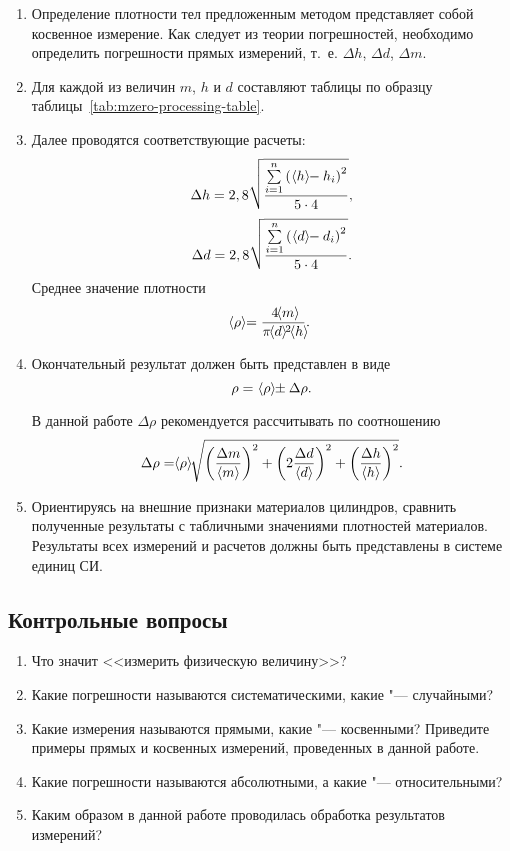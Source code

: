 \documentclass[a4paper, 12pt]{extarticle}
\newcommand{\isum}{\sum\limits_{i=1}^{n}}
\begin{document}
\begin{enumerate}
\item Определение плотности тел предложенным методом представляет собой косвенное измерение. Как следует из теории погрешностей, необходимо определить погрешности прямых измерений, т.~е. $\Delta h$, $\Delta d$, $\Delta m$.

\item Для каждой из величин $m$, $h$ и $d$ составляют таблицы по образцу таблицы~\ref{tab:mzero-processing-table}. %

\item Далее проводятся соответствующие расчеты:
\[
    \Delta h = 2,8 \sqrt{\frac{\isum\left(\ \MTDMean{h} - h_i \right)^2}{5 \cdot 4}},
\]
\[
    \Delta d = 2,8 \sqrt{\frac{\isum\left(\ \MTDMean{d} - d_i \right)^2}{5 \cdot 4}}.
\]
Среднее значение плотности
\[
\MTDMean{\rho} = \frac{4\MTDMean{m}}{\pi \MTDMean{d}^2 \MTDMean{h}}.
\]
\item Окончательный результат должен быть представлен в виде
\[
\rho =\ \hspace{-3pt}\left<\rho\right>\hspace{-3pt} \pm \Delta \rho.
\]


В данной работе $\Delta \rho$ рекомендуется рассчитывать по соотношению
\[
\Delta \rho = \MTDMean{\rho} \sqrt{\left(\frac{\Delta m}{\MTDMean{m}}\right)^2 + \left(2\frac{\Delta d}{\MTDMean{d}}\right)^2 + \left(\frac{\Delta h}{\MTDMean{h}}\right)^2}.
\]

\item Ориентируясь на внешние признаки материалов цилиндров, сравнить полученные результаты с табличными значениями плотностей материалов. Результаты всех измерений и расчетов должны быть представлены в системе единиц СИ.
\end{enumerate}

\subsection{Контрольные вопросы}
\begin{enumerate}
\item Что значит <<измерить физическую величину>>?
\item Какие погрешности называются систематическими, какие "--- случайными?
\item Какие измерения называются прямыми, какие "--- косвенными? Приведите примеры прямых и косвенных измерений,  проведенных в данной работе.
\item Какие погрешности называются абсолютными, а какие "--- относительными?
\item Каким образом в данной работе проводилась обработка результатов измерений?
\end{enumerate}
\end{document}
